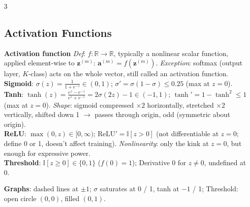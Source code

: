 \documentclass[10pt]{article}
\newcommand{\ind}{\mathbb{I}}
\newcommand{\sub}[1]{\textit{#1}:}  %
\newcommand{\va}{\mathbf{a}}
\newcommand{\vz}{\mathbf{z}}
\begin{document}
\begin{multicols*}{3}
\subsection{Activation Functions}
\textbf{Activation function} \sub{Def} $f:\mathbb R\to\mathbb R$, typically a nonlinear scalar function, applied element-wise to $\vz^{(m)}$: $\va^{(m)}=f(\vz^{(m)})$. \sub{Exception} softmax (output layer, $K$-class) acts on the whole vector, still called an activation function.\\
\textbf{Sigmoid}: $\sigma(z)=\frac1{1+e^{-z}}\in(0,1)$; $\sigma'=\sigma(1-\sigma)\le0.25$ (max at $z=0$).\\
\textbf{Tanh}: $\tanh(z)=\frac{e^z-e^{-z}}{e^z+e^{-z}}=2\sigma(2z)-1\in(-1,1)$; $\tanh'=1-\tanh^2\le1$ (max at $z=0$). \sub{Shape} sigmoid compressed $\times2$ horizontally, stretched $\times2$ vertically, shifted down 1 $\to$ passes through origin, odd (symmetric about origin).\\
\textbf{ReLU}: $\max(0,z)\in[0,\infty)$; $\text{ReLU}'=\ind[z>0]$ (not differentiable at $z=0$; define 0 or 1, doesn't affect training). \sub{Nonlinearity} only the kink at $z=0$, but enough for expressive power.\\
\textbf{Threshold}: $\ind[z\ge0]\in\{0,1\}$ ($f(0)=1$); Derivative 0 for $z\ne0$, undefined at 0.\\
\begin{minipage}{\linewidth}
\textbf{Graphs}: dashed lines at $\pm1$; $\sigma$ saturates at 0 / 1, tanh at $-1$ / 1; Threshold: open circle $(0,0)$, filled $(0,1)$.\\[1pt]
\end{minipage}
\end{multicols*}
\end{document}
